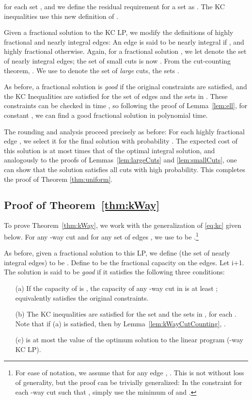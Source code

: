 \documentclass[11pt]{article}
\newcounter{thm0Rcopies}
\newcounter{thm_saved}
\def\KCLP{\eqref{eq:kc}\xspace}
\begin{document}
for each set , and we define the residual requirement for a set as
. The KC inequalities use
this new definition of .

Given a fractional solution  to the KC LP, we modify the
definitions of highly fractional and nearly integral edges: An edge
 is said to be nearly integral if , and highly fractional otherwise. Again, for a fractional
solution , we let  denote the set of nearly integral edges;
the set  of small cuts is now . From the cut-counting theorem, .  We use  to denote the set of \emph{large}
cuts, the sets .

As before, a fractional solution  is \emph{good} if the original
constraints are satisfied, and the KC Inequalities are satisfied for
the set of edges  and the sets in . These constraints can be
checked in time , so following the proof
of Lemma~\ref{lem:ell}, for constant , we can find a good
fractional solution in polynomial time.

The rounding and analysis proceed precisely as before: For each highly
fractional edge , we select it for the final solution with
probability . The expected cost of this
solution is at most  times that of the optimal
integral solution, and analogously to the proofs of
Lemmas~\ref{lem:largeCuts} and \ref{lem:smallCuts}, one can show that
the solution satisfies all cuts with high probability. This completes
the proof of Theorem \ref{thm:uniform}.



\subsection{Proof of Theorem~\ref{thm:kWay}}

To prove Theorem~\ref{thm:kWay}, we work with the generalization of
\KCLP given below. For any -way cut  and for any set of edges
, we use  to be .\footnote{For ease of notation, we assume that for any edge ,
  . This is not without loss of generality, but the
  proof can be trivially generalized: In the constraint for each
  -way cut  such that , simply use the
  minimum of  and .}

\vspace{-5mm}


As before, given a fractional solution  to this LP, we define 
(the set of nearly integral edges) to be . Define  to be the
fractional capacity on the edges.  Let i+1.  The solution  is
said to be {\em good} if it satisfies the following three conditions:

\begin{enumerate}
\item[(a)] If the capacity of  is , the capacity of any
  -way cut in  is at least ; equivalently  satisfies the
  original constraints.
\item[(b)] The KC inequalities are satisfied for the set  and the
  sets in , for each . Note that if (a) is
  satisfied, then by Lemma~\ref{lem:kWayCutCounting}, .
\item[(c)]  is at most the value of the optimum
  solution to the linear program (-way KC LP).
\end{enumerate}
\end{document}
